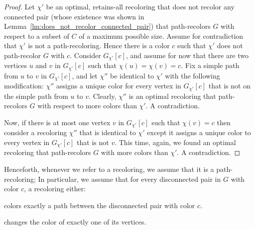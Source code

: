 \begin{proof}
Let $\chi'$ be an optimal, 
retains-all recoloring that does not recolor any connected pair 
(whose existence was shown in Lemma~\ref{lm:does_not_recolor_connected_pair}) 
that path-recolors $G$ with respect to a subset of $C$ of a maximum possible size. 
%
Assume for contradiction that $\chi'$ is not a path-recoloring.  
%
Hence there is a color $c$ such that $\chi'$ does not path-recolor $G$ with $c$.
%
Consider $G_{\chi'}[c]$, 
and assume for now that there are two vertices $u$
and $v$ in $G_{\chi'}[c]$ such that $\chi(u) = \chi(v) = c$.  
%
Fix a simple path from $u$ to $v$ in $G_{\chi'}[c]$, 
and let $\chi''$ be identical to $\chi'$ with the following modification: 
$\chi''$ assigns a unique color for every vertex in $G_{\chi'}[c]$ 
that is not on the simple path from $u$ to $v$.
%
Clearly, 
$\chi''$ is an optimal recoloring that path-recolors 
$G$ with respect to more colors than $\chi'$.  
%
A contradiction.
	
Now,
if there is at most one vertex $v$ in $G_{\chi'}[c]$ such that $\chi(v) = c$ 
then consider a recoloring $\chi''$ that is identical to $\chi'$ 
except it assigns a unique color to every vertex in $G_{\chi'}[c]$ that is not $v$.
%
This time, 
again, 
we found an optimal recoloring that path-recolors $G$ with more colors than $\chi'$.  
%
A contradiction.
{}\end{proof}

Henceforth, 
whenever we refer to a recoloring, 
we assume that it is a path-recoloring; 
In particular, 
we assume that for every disconnected pair in $G$ with color $c$, 
a recoloring either:
\begin{inparaenum}[(i)]
	\item colors exactly a path between the disconnected pair with color $c$.
	\item changes the color of exactly one of its vertices. 
\end{inparaenum}